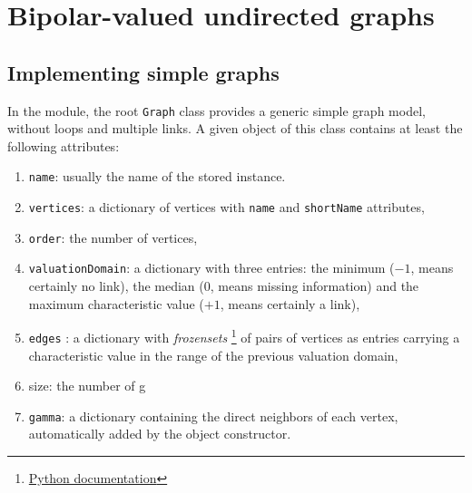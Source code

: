 \chapter{Bipolar-valued undirected graphs}
\label{sec:21}



\section{Implementing simple graphs}
\label{sec:21.1}

In the  module, the root \texttt{Graph} class  provides a generic simple graph model, without loops and multiple links. A given object of this class contains at least the following attributes:
\begin{enumerate}[topsep=1pt]
\item \texttt{name}: usually the name of the stored instance.
\item \texttt{vertices}: a dictionary of vertices with \texttt{name} and \texttt{shortName} attributes,
\item \texttt{order}: the number of vertices,
\item \texttt{valuationDomain}: a dictionary with three entries: the minimum ($-1$, means certainly no link), the median ($0$, means missing information) and the maximum characteristic value ($+1$, means certainly a link),
\item \texttt{edges} : a dictionary with \emph{frozensets} \footnote{\href{https://docs.python.org/3.9/library/stdtypes.html?highlight=frozenset\#frozenset}{Python documentation}} of pairs of vertices as entries carrying a characteristic value in the range of the previous valuation domain,
\item size: the number of g
\item \texttt{gamma}: a dictionary containing the direct neighbors of each vertex, automatically added by the object constructor.
\end{enumerate}

